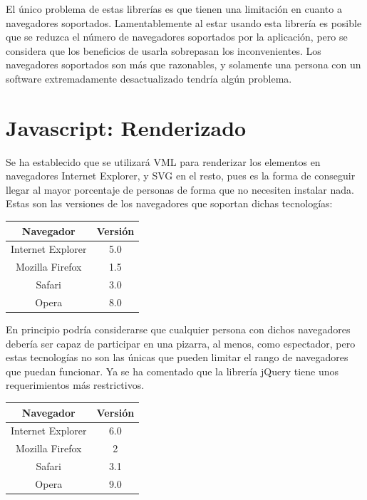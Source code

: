 El único problema de estas librerías es que tienen una limitación en cuanto a navegadores soportados. Lamentablemente al estar usando esta librería es posible que se reduzca el número de navegadores soportados por la aplicación, pero se considera que los beneficios de usarla sobrepasan los inconvenientes. Los navegadores soportados son más que razonables, y solamente una persona con un software extremadamente desactualizado tendría algún problema.

\section{Javascript: Renderizado}
Se ha establecido que se utilizará VML para renderizar los elementos en navegadores Internet Explorer, y SVG en el resto, pues es la forma de conseguir llegar al mayor porcentaje de personas de forma que no necesiten instalar nada. Estas son las versiones de los navegadores que soportan dichas tecnologías:

\begin{table}[h]
	\centering
		\begin{tabular}{|c|c|}
			\hline
			Navegador & Versión \\
			\hline
			Internet Explorer & 5.0 \\
			\hline
			Mozilla Firefox & 1.5 \\
			\hline
			Safari & 3.0 \\
			\hline
			Opera & 8.0 \\
			\hline
		\end{tabular}
\end{table}

En principio podría considerarse que cualquier persona con dichos navegadores debería ser capaz de participar en una pizarra, al menos, como espectador, pero estas tecnologías no son las únicas que pueden limitar el rango de navegadores que puedan funcionar. Ya se ha comentado que la librería jQuery tiene unos requerimientos más restrictivos.

\begin{table}[h]
	\centering
		\begin{tabular}{|c|c|}
			\hline
			Navegador & Versión \\
			\hline
			Internet Explorer & 6.0 \\
			\hline
			Mozilla Firefox & 2 \\
			\hline
			Safari & 3.1 \\
			\hline
			Opera & 9.0 \\
			\hline
		\end{tabular}
\end{table}

